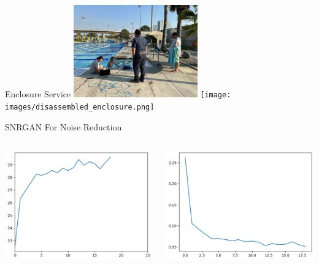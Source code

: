 \begin{frame}{Enclosure Service}
    \centering
    \includegraphics[width=0.4\textwidth,keepaspectratio]{images/towel_pool_testing.jpg}
    \texttt{[image: images/disassembled\_enclosure.png]}
\end{frame}

\begin{frame}{SNRGAN For Noise Reduction}
    \vspace{1em} 
    \begin{columns}
        \begin{column}{0.5\textwidth}
            \includegraphics[width=\linewidth,keepaspectratio]{images/psnr-test.png }
        \end{column}
        \begin{column}{0.5\textwidth}
            \includegraphics[width=\linewidth,keepaspectratio]{images/nmse-score.png}
        \end{column}
    \end{columns}


\end{frame}
